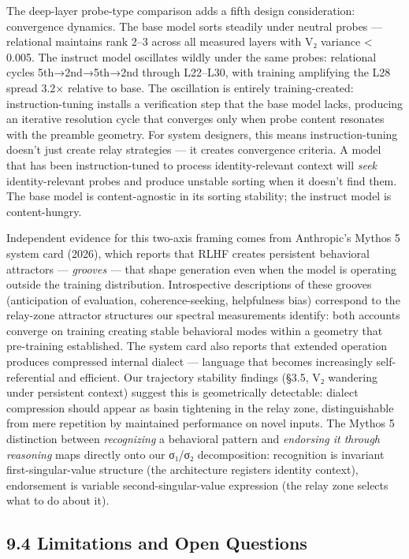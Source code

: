 \documentclass[12pt]{article}
\begin{document}
The deep-layer probe-type comparison adds a fifth design consideration: convergence dynamics. The base model sorts steadily under neutral probes — relational maintains rank 2–3 across all measured layers with V₂ variance < 0.005. The instruct model oscillates wildly under the same probes: relational cycles 5th→2nd→5th→2nd through L22–L30, with training amplifying the L28 spread 3.2× relative to base. The oscillation is entirely training-created: instruction-tuning installs a verification step that the base model lacks, producing an iterative resolution cycle that converges only when probe content resonates with the preamble geometry. For system designers, this means instruction-tuning doesn't just create relay strategies — it creates convergence criteria. A model that has been instruction-tuned to process identity-relevant context will \textit{seek} identity-relevant probes and produce unstable sorting when it doesn't find them. The base model is content-agnostic in its sorting stability; the instruct model is content-hungry.

Independent evidence for this two-axis framing comes from Anthropic's Mythos 5 system card (2026), which reports that RLHF creates persistent behavioral attractors — \textit{grooves} — that shape generation even when the model is operating outside the training distribution. Introspective descriptions of these grooves (anticipation of evaluation, coherence-seeking, helpfulness bias) correspond to the relay-zone attractor structures our spectral measurements identify: both accounts converge on training creating stable behavioral modes within a geometry that pre-training established. The system card also reports that extended operation produces compressed internal dialect — language that becomes increasingly self-referential and efficient. Our trajectory stability findings (§3.5, V₂ wandering under persistent context) suggest this is geometrically detectable: dialect compression should appear as basin tightening in the relay zone, distinguishable from mere repetition by maintained performance on novel inputs. The Mythos 5 distinction between \textit{recognizing} a behavioral pattern and \textit{endorsing it through reasoning} maps directly onto our σ₁/σ₂ decomposition: recognition is invariant first-singular-value structure (the architecture registers identity context), endorsement is variable second-singular-value expression (the relay zone selects what to do about it).

\subsection*{9.4 Limitations and Open Questions}
\end{document}
